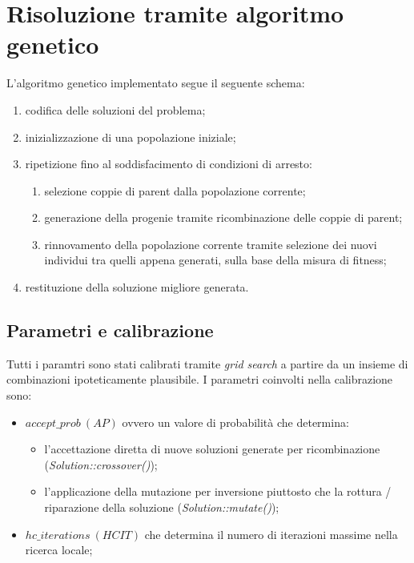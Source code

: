 \documentclass[a4paper]{article}
\begin{document}
    \section{Risoluzione tramite algoritmo genetico}
        L'algoritmo genetico implementato segue il seguente schema:
        \begin{enumerate}
            \item codifica delle soluzioni del problema;
            \item inizializzazione di una popolazione iniziale;
            \item ripetizione fino al soddisfacimento di condizioni di arresto:
                \begin{enumerate}
                    \item selezione coppie di parent dalla popolazione corrente;
                    \item generazione della progenie tramite ricombinazione delle coppie di parent;
                    \item rinnovamento della popolazione corrente tramite selezione dei nuovi individui
                        tra quelli appena generati, sulla base della misura di fitness;
                \end{enumerate}
            \item restituzione della soluzione migliore generata.
        \end{enumerate}

        \subsection{Parametri e calibrazione}
            Tutti i paramtri sono stati calibrati tramite \emph{grid search} a partire da un insieme di combinazioni ipoteticamente plausibile.
            I parametri coinvolti nella calibrazione sono:
            \begin{itemize}
                \item $accept\_prob\ (AP)$ ovvero un valore di probabilit\`a che determina:
                    \begin{itemize}
                        \item l'accettazione diretta di nuove soluzioni generate per ricombinazione (\emph{Solution::crossover()});
                        \item l'applicazione della mutazione per inversione piuttosto che la rottura / riparazione della soluzione (\emph{Solution::mutate()});
                    \end{itemize}
                \item $hc\_iterations\ (HCIT)$ che determina il numero di iterazioni massime nella ricerca locale;
            \end{itemize}
\end{document}
